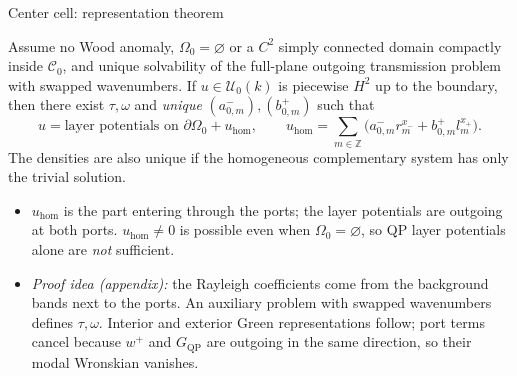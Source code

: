 \documentclass[aspectratio=169]{beamer}
\newcommand{\ZZ}{\mathbb{Z}}
\newcommand{\QP}{\mathrm{QP}}
\begin{document}
\begin{frame}{Center cell: representation theorem}
  \footnotesize
  \begin{theorem}
    Assume no Wood anomaly, $\Omega_0=\varnothing$ or a $C^2$ simply connected domain
    compactly inside $\mathcal C_0$, and unique solvability of the full-plane outgoing
    transmission problem with swapped wavenumbers. If $u\in\mathcal U_0(k)$ is piecewise
    $H^2$ up to the boundary, then there exist $\tau,\omega$ and \emph{unique}
    $(a^-_{0,m}),(b^+_{0,m})$ such that
    \[
      u=\text{layer potentials on }\partial\Omega_0+u_{\mathrm{hom}},\qquad
      u_{\mathrm{hom}}=\sum_{m\in\ZZ}\bigl(a^-_{0,m}r_m^{x_-}+b^+_{0,m}l_m^{x_+}\bigr).
    \]
    The densities are also unique if the homogeneous complementary system has only
    the trivial solution.
  \end{theorem}
  \begin{itemize}
    \item $u_{\mathrm{hom}}$ is the part entering through the ports; the layer
      potentials are outgoing at both ports. $u_{\mathrm{hom}}\neq0$ is possible even
      when $\Omega_0=\varnothing$, so QP layer potentials alone are \emph{not}
      sufficient.
    \item \emph{Proof idea (appendix):} the Rayleigh coefficients come from the
      background bands next to the ports. An auxiliary problem with swapped
      wavenumbers defines $\tau,\omega$. Interior and exterior Green representations
      follow; port terms cancel because $w^+$ and $G_\QP$ are outgoing in the same
      direction, so their modal Wronskian vanishes.
  \end{itemize}
\end{frame}
\end{document}
